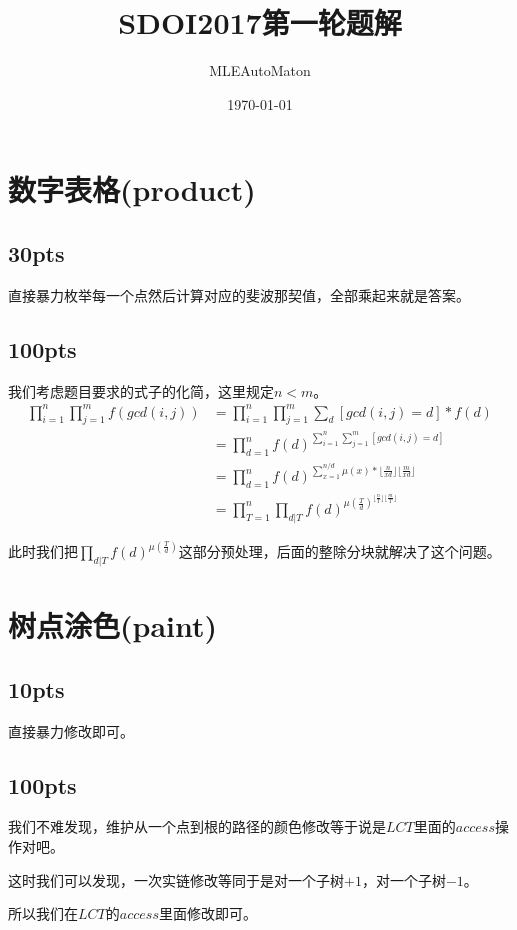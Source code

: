 \documentclass[UTF-8]{ctexart}
\title{SDOI2017第一轮题解}
\author{MLEAutoMaton}
\date{\today}
\begin{document}
	\maketitle%
	\newpage
	\tableofcontents%
	\newpage%
	
	\section{数字表格(product)}
	\subsection{30pts}
	直接暴力枚举每一个点然后计算对应的斐波那契值，全部乘起来就是答案。
	
	\subsection{100pts}
	我们考虑题目要求的式子的化简，这里规定$n < m$。
	\begin{align}
		\prod_{i=1}^n\prod_{j=1}^mf(gcd(i,j))&=\prod_{i=1}^n\prod_{j=1}^m\sum_{d}[gcd(i,j)=d]*f(d)\\
		&=\prod_{d=1}^nf(d)^{\sum_{i=1}^n\sum_{j=1}^m[gcd(i,j)=d]}\\
		&=\prod_{d=1}^nf(d)^{\sum_{x=1}^{n/d}\mu(x)*\lfloor \frac{n}{xd}\rfloor\lfloor \frac{m}{xd}\rfloor}\\
		&=\prod_{T=1}^n\prod_{d|T} f(d)^{\mu(\frac{T}{d})^{\lfloor \frac{n}{T}\rfloor\lfloor \frac{m}{T}\rfloor}}
	\end{align}
	
	此时我们把$\prod_{d|T} f(d)^{\mu(\frac{T}{d})}$这部分预处理，后面的整除分块就解决了这个问题。
	\section{树点涂色(paint)}
	\subsection{10pts}
	直接暴力修改即可。
	\subsection{100pts}
	我们不难发现，维护从一个点到根的路径的颜色修改等于说是$LCT$里面的$access$操作对吧。
	
	这时我们可以发现，一次实链修改等同于是对一个子树$+1$，对一个子树$-1$。
	
	所以我们在$LCT$的$access$里面修改即可。
	
\end{document}
